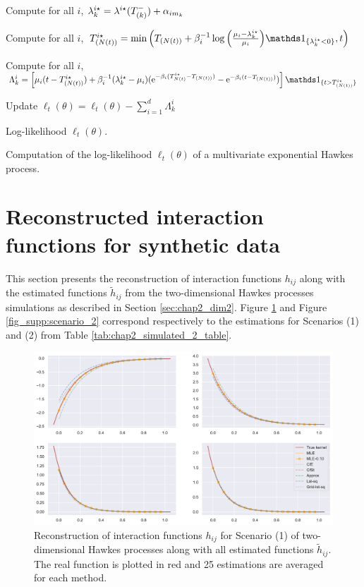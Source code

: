 \begin{subappendices}
\begin{algorithm}[!ht]
{     Compute for all $i$, $\lambda_k^{i\star} = \lambda^{i\star}(T_{(k)}^-) + \alpha_{im_k}$\;
  
     }
     Compute for all $i$, $T\park[N(t)]^{i\star} = \min{\adaptedpar{T\park[N(t)] + \beta_i^{-1}\log{\adaptedpar{\frac{\mu_i - \lambda_k^{i\star}}{\mu_i}}}\II_{\{\lambda_k^{i\star} < 0\}}, t}}$\;
  
     Compute for all $i$, $\Lambda^i_k = \left[\mu_i(t - T\park[N(t)]^{i\star}) + \beta_i^{-1}(\lambda_k^{i\star} - \mu_i)(\mathrm{e}^{-\beta_i(T_{N(t)}^{i\star} - T\park[N(t)])} - \mathrm{e}^{-\beta_i(t- T\park[N(t)])})\right]\II_{\{t > T\park[N(t)]^{i\star}\}}$\;
  
     Update $\ell_t(\theta) =  \ell_t(\theta) - \sum_{i=1}^{d}{\Lambda^i_k}$\;
  
     \Return Log-likelihood $\ell_t(\theta)$.
     \caption{Computation of the log-likelihood $\ell_t(\theta)$ of a multivariate exponential Hawkes process.}
     \label{alg:chap2_likelihood}
    \end{algorithm}
  
  
  \section{Reconstructed interaction functions for synthetic data}
  \label{app:chap2_numerical}
  
  This section presents the reconstruction of interaction functions $h_{ij}$ along with the estimated functions $\tilde h_{ij}$ from the two-dimensional Hawkes processes simulations as described in Section \ref{sec:chap2_dim2}. Figure \ref{fig_supp:scenario_1} and Figure \ref{fig_supp:scenario_2} correspond respectively to the estimations for Scenarios (1) and (2) from Table \ref{tab:chap2_simulated_2_table}.
  
  {\begin{figure}[!ht]
       \centering
       \includegraphics[width=\linewidth]{images/chapter3/reconstruction_param_1.pdf}
       \caption{Reconstruction of interaction functions $h_{ij}$ for Scenario (1) of two-dimensional Hawkes processes along with all estimated functions $\tilde h_{ij}$. The real function is plotted in red and 25 estimations are averaged for each method.}
       \label{fig_supp:scenario_1}
       \end{figure}}
       

\end{subappendices}
